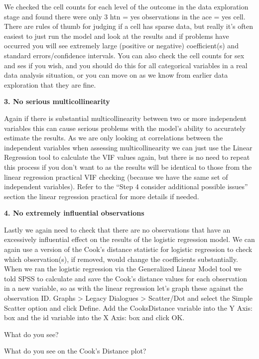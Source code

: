 \documentclass[
]{book}
\begin{document}
We checked the cell counts for each level of the outcome in the data exploration stage and found there were only 3 htn = yes observations in the ace = yes cell. There are rules of thumb for judging if a cell has sparse data, but really it's often easiest to just run the model and look at the results and if problems have occurred you will see extremely large (positive or negative) coefficient(s) and standard errors/confidence intervals. You can also check the cell counts for sex and ses if you wish, and you should do this for all categorical variables in a real data analysis situation, or you can move on as we know from earlier data exploration that they are fine.

\textbf{3. No serious multicollinearity}

Again if there is substantial multicollinearity between two or more independent variables this can cause serious problems with the model's ability to accurately estimate the results. As we are only looking at correlations between the independent variables when assessing multicollinearity we can just use the Linear Regression tool to calculate the VIF values again, but there is no need to repeat this process if you don't want to as the results will be identical to those from the linear regression practical VIF checking (because we have the same set of independent variables). Refer to the ``Step 4 consider additional possible issues'' section the linear regression practical for more details if needed.

\textbf{4. No extremely influential observations}

Lastly we again need to check that there are no observations that have an excessively influential effect on the results of the logistic regression model. We can again use a version of the Cook's distance statistic for logistic regression to check which observation(s), if removed, would change the coefficients substantially. When we ran the logistic regression via the Generalized Linear Model tool we told SPSS to calculate and save the Cook's distance values for each observation in a new variable, so as with the linear regression let's graph these against the observation ID. Graphs \textgreater{} Legacy Dialogues \textgreater{} Scatter/Dot and select the Simple Scatter option and click Define. Add the CooksDistance variable into the Y Axis: box and the id variable into the X Axis: box and click OK.

What do you see?

What do you see on the Cook's Distance plot?
\end{document}
